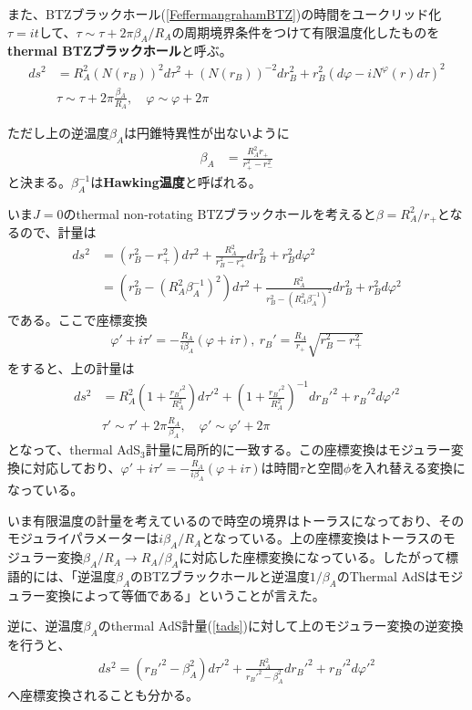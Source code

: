 また、BTZブラックホール(\ref{FeffermangrahamBTZ})の時間をユークリッド化$\tau=it$して、$\tau\sim \tau+2\pi \beta_A/R_A$の周期境界条件をつけて有限温度化したものを\textbf{thermal BTZブラックホール}と呼ぶ。
\begin{align}
ds^2&=R_A^2(N(r_{B}))^2d\tau^2+(N(r_{B}))^{-2}dr_{B}^2+r_{B}^2(d\varphi-iN^\varphi(r)d\tau)^2\\
&\tau\sim \tau+2\pi\frac{\beta_A}{R_A},\quad \varphi\sim \varphi+2\pi
\end{align}

ただし上の逆温度$\beta_A$は円錐特異性が出ないように
\begin{align}
\beta_A&=\frac{R_A^2 r_+}{r_+^2-r_-^2}
\end{align}
と決まる。$\beta_A^{-1}$は\textbf{Hawking温度}と呼ばれる。

いま$J=0$のthermal non-rotating BTZブラックホールを考えると$\beta=R_A^2/r_+$となるので、計量は
\begin{align}
ds^2&=(r_{B}^2-r_+^2)d\tau^2+\frac{R_A^2}{r_{B}^2-r_+^2}dr_{B}^2+r_{B}^2d\varphi^2\\
&=(r_{B}^2-(R_A^2\beta_A^{-1})^2)d\tau^2+\frac{R_A^2}{r_{B}^2-(R_A^2\beta_A^{-1})^2}dr_{B}^2+r_{B}^2d\varphi^2\label{adsbcftBTZmetric}
\end{align}
である。ここで座標変換
\begin{align}
\varphi'+i\tau'=-\frac{R_A}{i\beta_A}(\varphi+i\tau),\ r_B'=\frac{R_A}{r_+}\sqrt{r_B^2-r_+^2}
\end{align}
をすると、上の計量は
\begin{align}
ds^2&=R_A^2\left(1+\frac{r_{B}'^2}{R_A^2}\right)d\tau'^2+\left(1+\frac{r_{B}'^2}{R_A^2}\right)^{-1}dr_{B}'^2+r_{B}'^2d\varphi'^2\\
&\tau'\sim \tau'+2\pi\frac{R_A}{\beta_A},\quad \varphi'\sim \varphi'+2\pi
\end{align}
となって、thermal AdS$_3$計量に局所的に一致する。この座標変換はモジュラー変換に対応しており、$\varphi'+i\tau'=-\frac{R_A}{i\beta_A}(\varphi+i\tau)$は時間$\tau$と空間$\phi$を入れ替える変換になっている。

いま有限温度の計量を考えているので時空の境界はトーラスになっており、そのモジュライパラメーターは$i\beta_A/R_A$となっている。上の座標変換はトーラスのモジュラー変換$\beta_A/R_A\to R_A/\beta_A$に対応した座標変換になっている。したがって標語的には、「逆温度$\beta_A$のBTZブラックホールと逆温度$1/\beta_A$のThermal AdSはモジュラー変換によって等価である」ということが言えた。

逆に、逆温度$\beta_A$のthermal AdS計量(\ref{tads})に対して上のモジュラー変換の逆変換を行うと、
\begin{align}
ds^2=(r_{B}'^2-\beta_A^2)d\tau'^2+\frac{R_A^2}{r_{B}'^2-\beta_A^2}dr_{B}'^2+r_{B}'^2d\varphi'^2\label{adsbcftTAdSmetric}
\end{align}
へ座標変換されることも分かる。


